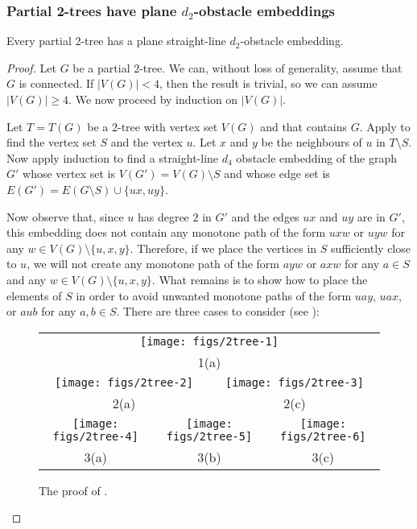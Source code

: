\documentclass{patmorin}
\begin{document}
\subsubsection{Partial 2-trees have plane $d_2$-obstacle embeddings}

\begin{thm}
  Every partial 2-tree has a plane straight-line $d_2$-obstacle embedding.
\end{thm}

\begin{proof}
  Let $G$ be a partial 2-tree. We can, without loss of generality, assume
  that $G$ is connected.  If $|V(G)|< 4$, then the result is trivial, so
  we can assume $|V(G)|\ge 4$.  We now proceed by induction on $|V(G)|$.

  Let $T=T(G)$ be a 2-tree with vertex set $V(G)$ and that contains $G$.
  Apply  to find the vertex set $S$ and the vertex $u$.
  Let $x$ and $y$ be the neighbours of $u$ in $T\setminus S$. Now apply
  induction to find a straight-line $d_4$ obstacle embedding of the
  graph $G'$ whose vertex set is $V(G')=V(G)\setminus S$ and whose edge
  set is $E(G')=E(G\setminus S)\cup\{ux,uy\}$.

  Now observe that, since $u$ has degree 2 in $G'$ and the edges $ux$
  and $uy$ are in $G'$, this embedding does not contain any monotone path
  of the form $uxw$ or $uyw$ for any $w\in V(G)\setminus\{u,x,y\}$.
  Therefore, if we place the vertices in $S$ sufficiently close to $u$,
  we will not create any monotone path of the form $ayw$ or $axw$ for
  any $a\in S$ and any $w\in V(G)\setminus \{u,x,y\}$.  What remains
  is to show how to place the elements of $S$ in order to avoid unwanted
  monotone paths of the form $uay$, $uax$, or $aub$ for any $a,b\in S$.
  There are three cases to consider (see ):

  \begin{figure}
    \begin{tabular}{cccccc}
       \multicolumn{6}{c}{\texttt{[image: figs/2tree-1]}} \\
       \multicolumn{6}{c}{1(a)} \\
       \multicolumn{3}{c}{\texttt{[image: figs/2tree-2]}} & 
       \multicolumn{3}{c}{\texttt{[image: figs/2tree-3]}} \\
       \multicolumn{3}{c}{2(a)} &
       \multicolumn{3}{c}{2(c)} \\
       \multicolumn{2}{c}{\texttt{[image: figs/2tree-4]}} &
       \multicolumn{2}{c}{\texttt{[image: figs/2tree-5]}} &
       \multicolumn{2}{c}{\texttt{[image: figs/2tree-6]}} \\
       \multicolumn{2}{c}{3(a)} &
       \multicolumn{2}{c}{3(b)} &
       \multicolumn{2}{c}{3(c)} 
    \end{tabular}
  \caption{The proof of .}
  \end{figure}
  

\end{proof}
\end{document}
